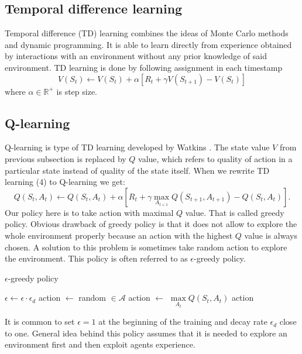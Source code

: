 \subsection{Temporal difference learning}
Temporal difference (TD) learning combines the ideas of Monte Carlo methods and dynamic programming. It is able to learn directly from experience obtained by interactions with an environment without any prior knowledge of said environment. TD learning is done by following assignment in each timestamp \cite{sutton2012}
\begin{equation}
V(S_t) \gets V(S_t) + \alpha [R_{t} + \gamma V(S_{t+1}) - V(S_t)]
\end{equation}
where $\alpha \in \mathbb{R}^+$ is step size.

\subsection{Q-learning}
Q-learning is type of TD learning developed by Watkins \cite{watkins1992}. The state value $V$ from previous subsection is replaced by $Q$ value, which refers to quality of action in a particular state instead of quality of the state itself. When we rewrite TD learning (4) to Q-learning we get:
\begin{equation}
Q(S_t, A_t) \gets Q(S_t, A_t) + \alpha [R_{t} + \gamma \underset{A_{t+1}}{\max} Q(S_{t+1}, A_{t+1}) - Q(S_t, A_t)].
\end{equation}
Our policy here is to take action with maximal $Q$ value. That is called greedy policy. Obvious drawback of greedy policy is that it does not allow to explore the whole environment properly because an action with the highest $Q$ value is always chosen. A solution to this problem is sometimes take random action to explore the environment. This policy is often referred to as $\epsilon$-greedy policy.

\begin{algorithm}
\caption{$\epsilon$-greedy policy}\label{euclid}
\begin{algorithmic}[1]
\State $\epsilon \gets \epsilon \cdot \epsilon_d$
\State action $\gets$ random $\in \mathcal{A}$
\Else 
\State action $\gets$ $\underset{A_t}{\max} Q(S_t, A_t)$
\EndIf
\State \Return action
\EndProcedure
\end{algorithmic}
\end{algorithm}

It is common to set $\epsilon = 1$ at the beginning of the training and decay rate $\epsilon_d$ close to one. General idea behind this policy assumes that it is needed to explore an environment first and then exploit agents experience.

